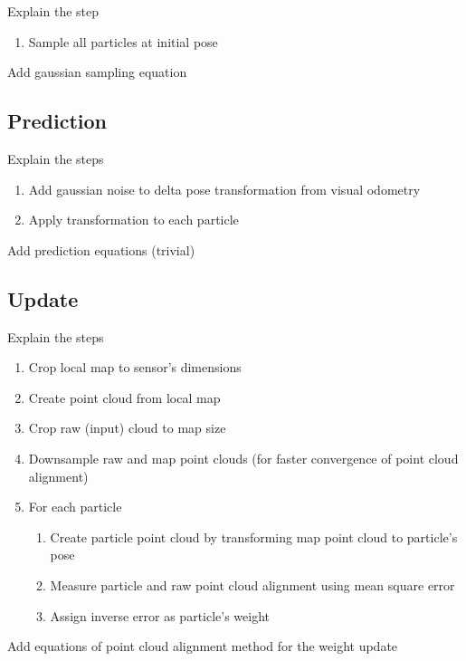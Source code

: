 Explain the step

\begin{enumerate}
    \item Sample all particles at initial pose
\end{enumerate}

\noindent
Add gaussian sampling equation

\subsection{Prediction}

Explain the steps

\begin{enumerate}
    \item Add gaussian noise to delta pose transformation from visual odometry
    \item Apply transformation to each particle
\end{enumerate}

\noindent
Add prediction equations (trivial)

\subsection{Update}

Explain the steps

\begin{enumerate}
    \item Crop local map to sensor's dimensions
    \item Create point cloud from local map
    \item Crop raw (input) cloud to map size
    \item Downsample raw and map point clouds (for faster convergence of point cloud alignment)
    \item For each particle
        \begin{enumerate}
            \item Create particle point cloud by transforming map point cloud to particle's pose
            \item Measure particle and raw point cloud alignment using mean square error
            \item Assign inverse error as particle's weight
        \end{enumerate}
\end{enumerate}

\noindent
Add equations of point cloud alignment method for the weight update

